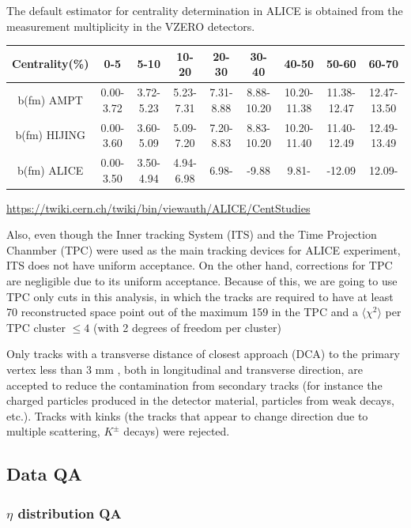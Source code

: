 The default estimator for centrality determination in ALICE is obtained from the measurement multiplicity in the VZERO detectors. 

\begin{center} \tiny{
\begin{tabular}{ |c|c c c c c c c c| } 
 \hline
Centrality(\%)&0-5      &5-10     &10-20    &20-30    &30-40     &40-50      &50-60      &60-70\\ 
\hline
b(fm) AMPT    &0.00-3.72&3.72-5.23&5.23-7.31&7.31-8.88&8.88-10.20&10.20-11.38&11.38-12.47&12.47-13.50\\ 
b(fm) HIJING  &0.00-3.60&3.60-5.09&5.09-7.20&7.20-8.83&8.83-10.20&10.20-11.40&11.40-12.49&12.49-13.49\\ 
b(fm) ALICE   &0.00-3.50&3.50-4.94&4.94-6.98&6.98-    &    -9.88 &9.81-      &     -12.09&12.09-\\
 \hline
\end{tabular}
\url{https://twiki.cern.ch/twiki/bin/viewauth/ALICE/CentStudies}
\label{table:impact} }
\end{center}



Also, even though the Inner tracking System (ITS) and the Time Projection Chanmber (TPC) were used as the main tracking devices for ALICE experiment, ITS does not have uniform acceptance. On the other hand, corrections for TPC are negligible due to its uniform acceptance. Because of this, we are going to use TPC only cuts in this analysis, in which the tracks are required to have at least 70 reconstructed space point out of the maximum 159 in the TPC and a $\langle \chi^2 \rangle$ per TPC cluster $\le 4$ (with 2 degrees of freedom per cluster)

Only tracks with a transverse distance of closest approach (DCA) to the primary vertex less than 3 mm
, both in longitudinal and transverse direction, are accepted to reduce the contamination from secondary tracks (for instance the charged particles produced 
in the detector material, particles from weak decays, etc.). 
Tracks with kinks (the tracks that appear to change direction due to multiple scattering, $K^{\pm}$ decays) were rejected.
 

\vskip20mm
\subsection{Data QA}

\subsubsection{ $\eta$ distribution QA} 

